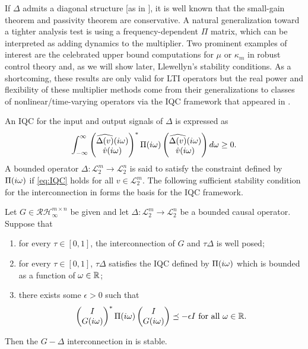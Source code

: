 If $\Delta$ admits a diagonal structure [as in ], it is well known that the small-gain theorem 
and passivity theorem are conservative. A natural generalization toward a tighter analysis test is using a frequency-dependent 
$\Pi$ matrix, {which can be interpreted as} adding dynamics to the multiplier. Two prominent examples of 
interest are the celebrated upper bound computations for $\mu$ or $\kappa_m$ in robust control theory and, as we will 
show later, Llewellyn's stability conditions. As a shortcoming, these results are only valid for LTI operators but the 
real power and flexibility of these multiplier methods come from {their} generalizations to classes of nonlinear/time-varying 
operators via the IQC framework that appeared in \cite{megretski}.

An IQC for the input and output signals of $\Delta$ is expressed as
\begin{equation}{\displaystyle\ensuremath{\int_{-\infty}^\infty{\begin{pmatrix}\widehat{\Delta(v)}(i\omega)\\\hat{v}(i\omega)\end{pmatrix}^*\Pi(i\omega)\begin{pmatrix}\widehat{\Delta(v)}(i\omega)\\\hat{v}(i\omega)\end{pmatrix}d\omega}}} \geq 0.
\label{eq:IQC}
\end{equation}
A bounded operator $\Delta:\mathcal{L}^m_2\to\mathcal{L}^n_2$ is said to satisfy the constraint defined by $\Pi(i\omega)$ 
if \eqref{eq:IQC} holds for all $v\in\mathcal{L}^m_2$. The following sufficient {stability condition for the interconnection 
in } forms the basis for the IQC framework. 


\begin{thm}\label{IQCthm} Let $G\in\mathcal{RH}^{m\times n}_\infty$ be given and 
let $\Delta:\mathcal{L}^m_2\to\mathcal{L}^n_2$ be a bounded causal operator. Suppose that
\begin{enumerate}
	\item for every $\tau\in[0,1]$, the interconnection of $G$ and $\tau\Delta$ is well posed;
	\item for every $\tau\in[0,1]$, $\tau\Delta$ satisfies the IQC 
    defined by $\Pi(i\omega)$ which is bounded as a function of $\omega\in\mathbb{R}$;
	\item there exists some $\epsilon>0$ such that
	\begin{equation}
	\begin{pmatrix}I\\G(i\omega)\end{pmatrix}^*\Pi(i\omega)\begin{pmatrix}I\\G(i\omega)\end{pmatrix} \preceq -\epsilon I\text{\ for all\ }\omega\in\mathbb{\mathbb{R}}.
	\label{eq:IQCthmFDI}
	\end{equation}
\end{enumerate}
Then the $G-\Delta$ interconnection {in }  is stable.
\end{thm}

